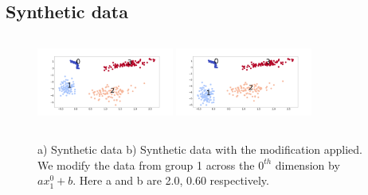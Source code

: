 \subsection{Synthetic data}
\begin{figure}[H]
    \centering
    \includegraphics[width=0.4\textwidth, height=3cm]{images/synthetic/synth-rep.png}
    \includegraphics[width=0.4\textwidth, height=3cm]{images/synthetic/modified.png}
    \caption{a) Synthetic data b) Synthetic data with the modification applied. We modify the data from group 1 across the $0^{th}$ dimension by $ax_{1}^{0} + b$. Here a and b are 2.0, 0.60 respectively.}
    \label{fig:synth_modified}
\end{figure}

